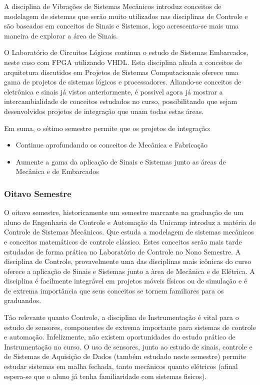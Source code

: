 \documentclass[12pt]{article} %
\begin{document}
A disciplina de Vibrações de Sistemas Mecânicos introduz conceitos de modelagem de sistemas que serão muito utilizados nas disciplinas de Controle e são baseados em conceitos de Sinais e Sistemas, logo acrescenta-se mais uma maneira de explorar a área de Sinais.

O Laboratório de Circuitos Lógicos continua o estudo de Sistemas Embarcados, neste caso com FPGA utilizando VHDL. Esta disciplina aliada a conceitos de arquitetura discutidos em Projetos de Sistemas Computacionais oferece uma gama de projetos de sistemas lógicos e processadores. Aliando-se conceitos de eletrônica e sinais já vistos anteriormente, é possivel agora já mostrar a intercambialidade de conceitos estudados no curso, possibilitando que sejam desenvolvidos projetos de integração que unam todas estas áreas.

Em suma, o sétimo semestre permite que os projetos de integração:

\begin{itemize}
\item Continue aprofundando os conceitos de Mecânica e Fabricação
\item Aumente a gama da aplicação de Sinais e Sistemas junto as áreas de Mecânica e de Embarcados
\end{itemize}

\subsubsection{Oitavo Semestre}

O oitavo semestre, historicamente um semestre marcante na graduação de um aluno de Engenharia de Controle e Automação da Unicamp introduz a matéria de Controle de Sistemas Mecânicos. Que estuda a modelagem de sistemas mecânicos e conceitos matemáticos de controle clássico. Estes conceitos serão mais tarde estudados de forma prática no Laboratório de Controle no Nono Semestre. A disciplina de Controle, provavelmente uma das disciplinas mais icônicas do curso oferece a aplicação de Sinais e Sistemas junto a àrea de Mecânica e de Elétrica. A disciplina é facilmente integrável em projetos móveis físicos ou de simulação e é de extrema importância que seus conceitos se tornem familiares para os graduandos. 

Tão relevante quanto Controle, a disciplina de Instrumentação é vital para o estudo de sensores, componentes de extrema importante para sistemas de controle e automação. Infelizmente, não existem oportunidades do estudo prático de Instrumentação no curso. O uso de sensores, junto ao estudo de sinais, controle e de Sistemas de Aquisição de Dados (também estudado neste semestre) permite estudar sistemas em malha fechada, tanto mecânicos quanto elétricos (afinal espera-se que o aluno já tenha familiaridade com sistemas fisicos).
\end{document}
